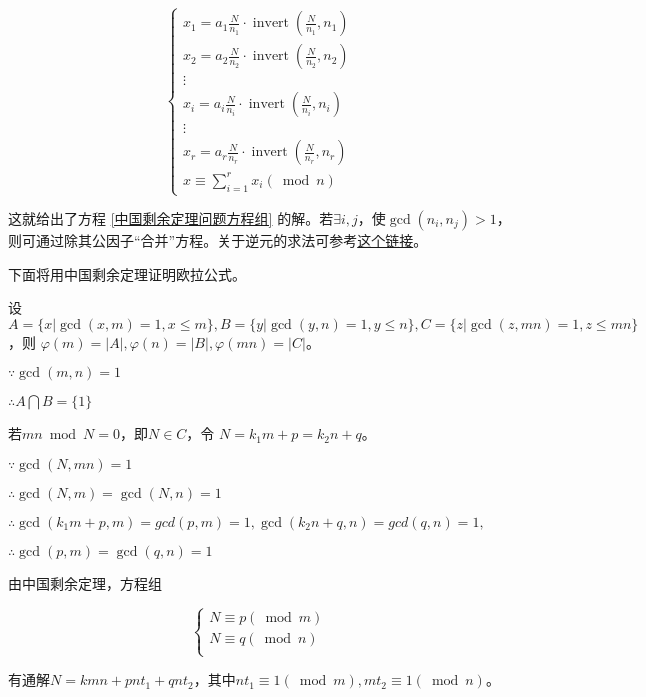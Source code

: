 \documentclass[a4paper]{article}         %
\begin{document}
\[
	\begin{cases}
		x_1 = a_1\frac{N}{n_1} \cdot \operatorname{invert}(\frac{N}{n_1}, n_1)\\
        x_2 = a_2\frac{N}{n_2} \cdot \operatorname{invert}(\frac{N}{n_2}, n_2)\\
        \vdots                                      \\
        x_i = a_i\frac{N}{n_i} \cdot \operatorname{invert}(\frac{N}{n_i}, n_i) \\
        \vdots                                      \\
        x_r = a_r\frac{N}{n_r} \cdot \operatorname{invert}(\frac{N}{n_r}, n_r)\\
        x \equiv \sum \limits_{i=1}^{r} x_i(\bmod n)
	\end{cases}
\]

这就给出了方程 \ref{中国剩余定理问题方程组} 的解。若$\exists i, j$，使$\gcd(n_i, n_j) > 1$，则可通过除其公因子“合并”方程。关于逆元的求法可参考\href{https://blog.csdn.net/xiaoming_p/article/details/79644386}{这个链接}。

下面将用中国剩余定理证明欧拉公式。

设$A = \{ x \vert \gcd(x, m) = 1, x \leqslant m \}, B = \{ y \vert \gcd(y, n) = 1, y \leqslant n \}, C = \{ z \vert \gcd(z, mn) = 1, z \leqslant mn \}$，则 $\varphi(m) = \left\lvert A\right\rvert,\varphi(n) = \left\lvert B\right\rvert,\varphi(mn) = \left\lvert C\right\rvert$。

$\because \gcd(m, n) = 1$

$\therefore A \bigcap B = \{ 1 \}$

若$mn \bmod N = 0$，即$N \in C$，令 $N = k_1m + p = k_2n + q$。

$\because \gcd(N, mn) = 1$

$\therefore \gcd(N, m) = \gcd(N, n) = 1$

$\therefore \gcd(k_1m + p, m) = gcd(p, m) = 1, \gcd(k_2n + q, n) = gcd(q, n) = 1,$

$\therefore \gcd(p, m) = \gcd(q, n) = 1$

由中国剩余定理，方程组

\[
    \begin{cases}
        N \equiv p(\bmod m)\\
        N \equiv q(\bmod n)\\
    \end{cases}
\]

有通解$N = kmn + pnt_1 + qnt_2$，其中$nt_1 \equiv 1(\bmod m), mt_2 \equiv 1 (\bmod n)$。
\end{document}
